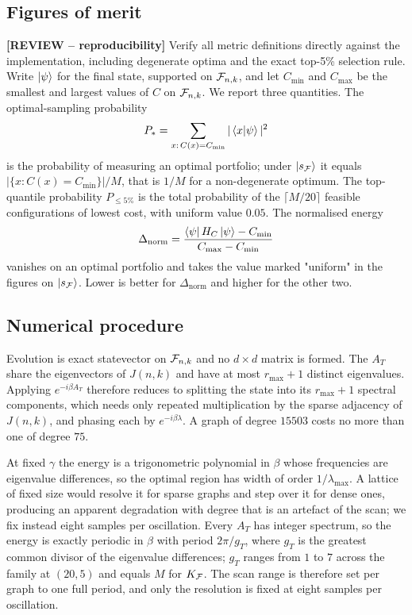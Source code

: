 \subsection{\label{sec:metrics}Figures of merit}

{\color{red}\textbf{[REVIEW -- reproducibility]} Verify all metric definitions directly against the implementation, including degenerate optima and the exact top-5\% selection rule.}
Write $\ket{\psi}$ for the final state, supported on $\mathcal{F}_{n,k}$, and let
$C_{\min}$ and $C_{\max}$ be the smallest and largest values of $C$ on
$\mathcal{F}_{n,k}$. We report three quantities. The optimal-sampling probability
\begin{equation}
    P_*=\sum_{x:\,C(x)=C_{\min}}|\braket{x}{\psi}|^{2}
    \label{eq:metric-popt}
\end{equation}
is the probability of measuring an optimal portfolio; under
$\ket{s_{\mathcal{F}}}$ it equals $|\{x:C(x)=C_{\min}\}|/M$, that is $1/M$ for a
non-degenerate optimum. The top-quantile probability $P_{\le5\%}$ is the
total probability of the $\lceil M/20\rceil$ feasible configurations of
lowest cost, with uniform value $0.05$. The normalised energy
\begin{equation}
    \Delta_{\mathrm{norm}}
    =\frac{\bra{\psi}H_C\ket{\psi}-C_{\min}}{C_{\max}-C_{\min}}
    \label{eq:metric-delta}
\end{equation}
vanishes on an optimal portfolio and takes the value marked "uniform" in
the figures on $\ket{s_{\mathcal{F}}}$. Lower is better for
$\Delta_{\mathrm{norm}}$ and higher for the other two.

\subsection{\label{sec:numerics}Numerical procedure}
Evolution is exact statevector on $\mathcal{F}_{n,k}$ and no $d\times d$ matrix is
formed. The $A_T$ share the eigenvectors of $J(n,k)$ and have at most
$r_{\max}+1$ distinct eigenvalues. Applying $e^{-i\beta A_T}$ therefore
reduces to splitting the state into its $r_{\max}+1$ spectral components,
which needs only repeated multiplication by the sparse adjacency of
$J(n,k)$, and phasing each by $e^{-i\beta\lambda}$. A graph of degree
$15503$ costs no more than one of degree $75$.

At fixed $\gamma$ the energy is a trigonometric polynomial in $\beta$
whose frequencies are eigenvalue differences, so the optimal region has
width of order $1/\lambda_{\max}$. A lattice of fixed size would resolve
it for sparse graphs and step over it for dense ones, producing an
apparent degradation with degree that is an artefact of the scan; we fix
instead eight samples per oscillation. Every $A_T$ has integer spectrum,
so the energy is exactly periodic in $\beta$ with period $2\pi/g_T$,
where $g_T$ is the greatest common divisor of the eigenvalue differences;
$g_T$ ranges from $1$ to $7$ across the family at $(20,5)$ and equals $M$
for $K_{\mathcal{F}}$. The scan range is therefore set per graph to one full
period, and only the resolution is fixed at eight samples per
oscillation.

